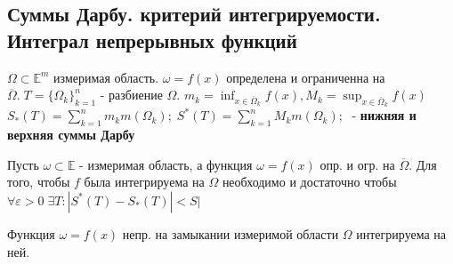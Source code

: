 \documentclass{letnab}
\begin{document}
\subsection{Суммы Дарбу. критерий интегрируемости.\\ Интеграл непрерывных функций}

$\Omega \subset \mathbb{E}^m $ измеримая область. $\omega=f(x) $ определена и ограниченна на $\overline{\Omega}.\; T=\{\Omega_k \}_{k=1}^n $ - разбиение $\Omega$. $m_k=\inf_{x\in \overline{\Omega}_k} f(x) , M_k=\sup_{x\in \overline{\Omega}_k} f(x)$\\
$S_*(T)=\sum_{k=1}^n m_k m(\Omega_k); \; S^*(T)=\sum_{k=1}^n M_k m(\Omega_k); \;  $ - \textbf{ нижняя и верхняя  суммы Дарбу}
 
\begin{theorem}
	Пусть $\omega\subset \mathbb{E}$ - измеримая область, а функция $\omega=f(x)$ опр. и огр. на $\overline{\Omega}$. Для того, чтобы $f $ была интегрируема на $\Omega$ необходимо и достаточно чтобы $\boxed{\forall \varepsilon>0\; \exists T: |S^*(T) - S_*(T)|<S |} $
\end{theorem}

\begin{theorem}
	Функция $\omega=f(x)$ непр. на замыкании измеримой области $\Omega $ интегрируема на ней.
\end{theorem}




\end{document}
